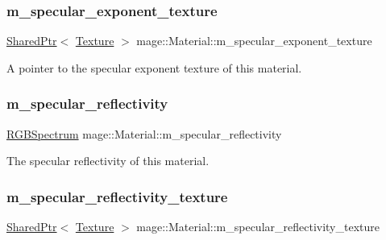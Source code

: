 \subsubsection{\texorpdfstring{m\+\_\+specular\+\_\+exponent\+\_\+texture}{m\_specular\_exponent\_texture}}
{\footnotesize\ttfamily \hyperlink{namespacemage_a1e01ae66713838a7a67d30e44c67703e}{Shared\+Ptr}$<$ \hyperlink{classmage_1_1_texture}{Texture} $>$ mage\+::\+Material\+::m\+\_\+specular\+\_\+exponent\+\_\+texture\hspace{0.3cm}{\ttfamily [private]}}

A pointer to the specular exponent texture of this material. \hypertarget{structmage_1_1_material_a45587388f4ff57c209de2280b71af9d3}{}\label{structmage_1_1_material_a45587388f4ff57c209de2280b71af9d3} 
\subsubsection{\texorpdfstring{m\+\_\+specular\+\_\+reflectivity}{m\_specular\_reflectivity}}
{\footnotesize\ttfamily \hyperlink{structmage_1_1_r_g_b_spectrum}{R\+G\+B\+Spectrum} mage\+::\+Material\+::m\+\_\+specular\+\_\+reflectivity\hspace{0.3cm}{\ttfamily [private]}}

The specular reflectivity of this material. \hypertarget{structmage_1_1_material_ac925df9d71f8668c03e8efada632b300}{}\label{structmage_1_1_material_ac925df9d71f8668c03e8efada632b300} 
\subsubsection{\texorpdfstring{m\+\_\+specular\+\_\+reflectivity\+\_\+texture}{m\_specular\_reflectivity\_texture}}
{\footnotesize\ttfamily \hyperlink{namespacemage_a1e01ae66713838a7a67d30e44c67703e}{Shared\+Ptr}$<$ \hyperlink{classmage_1_1_texture}{Texture} $>$ mage\+::\+Material\+::m\+\_\+specular\+\_\+reflectivity\+\_\+texture\hspace{0.3cm}{\ttfamily [private]}}

